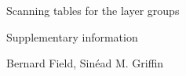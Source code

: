 \documentclass{article}
\begin{document}
	\begin{center}
		{\Large Scanning tables for the layer groups}
		
		{\large Supplementary information}
		
		Bernard Field, Sin\'ead M. Griffin
	\end{center}
	
\end{document}
